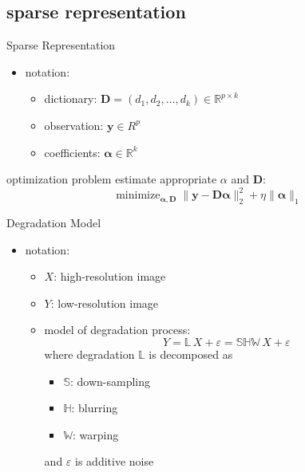 \documentclass[fleqn,aspectratio=1610]{beamer}
\begin{document}
\subsection{sparse representation}
\label{sec:org451bfb1}
\begin{frame}[label={sec:orgc71fa64}]{Sparse Representation}
\begin{itemize}
\item notation:
\begin{itemize}
\item dictionary:
\(\mathbf{D}=(d_{1},d_{2},\dotsc,d_{k})\in\mathbb{R}^{p\times k}\)
\item observation: \(\boldsymbol{y}\in R^{p}\)
\item coefficients: \(\boldsymbol{\alpha}\in\mathbb{R}^{k}\)
\end{itemize}
\end{itemize}
\medskip
\begin{alertblock}{optimization problem}
estimate appropriate \(\alpha\) and \(\mathbf{D}\):
\begin{equation}
  \mathop{\text{minimize}}_{\boldsymbol{\alpha},\mathbf{D}}
  \|\boldsymbol{y}-\mathbf{D}\boldsymbol{\alpha}\|_{2}^{2}
  +\eta\|\boldsymbol{\alpha}\|_{1}
\end{equation}
\end{alertblock}
\end{frame}

\begin{frame}[label={sec:orgfc1c14b}]{Degradation Model}
\begin{itemize}
\item notation:
\begin{itemize}
\item \(X\): high-resolution image
\item \(Y\): low-resolution image
\item model of degradation process:
\begin{equation}
  Y=\mathbb{L}\,X+\varepsilon=\mathbb{SHW}\,X+\varepsilon
\end{equation}
where degradation \(\mathbb{L}\) is decomposed as
\begin{itemize}
\item \(\mathbb{S}\): down-sampling
\item \(\mathbb{H}\): blurring
\item \(\mathbb{W}\): warping
\end{itemize}
and \(\varepsilon\) is additive noise
\end{itemize}
\end{itemize}
\end{frame}
\end{document}
